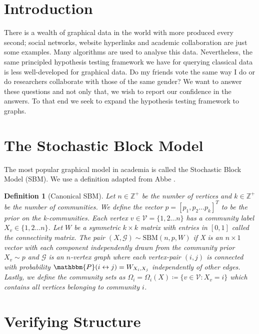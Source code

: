 \documentclass[]{article}
\newcommand{\Gcal}{\mathcal{G}}
\newcommand{\Vcal}{\mathcal{V}}
\newcommand{\Integers}{\mathbb{Z}}
\newcommand{\prob}{\mathbbm{P}}
\newtheorem{definition}{Definition}[section]
\begin{document}
\begin{multicols*}{2}

\section{Introduction}

There is a wealth of graphical data in the world with more produced every second; social networks, website hyperlinks and academic collaboration are just some examples. Many algorithms are used to analyse this data. Nevertheless, the same principled hypothesis testing framework we have for querying classical data is less well-developed for graphical data. Do my friends vote the same way I do or do researchers collaborate with those of the same gender? We want to answer these questions and not only that, we wish to report our confidence in the answers. To that end we seek to expand the hypothesis testing framework to graphs.

\section{The Stochastic Block Model}

The most popular graphical model in academia is called the Stochastic Block Model (SBM). We use a definition adapted from Abbe \cite{Abbe}.

\begin{definition}[Canonical SBM]
	\label{defn:sbm}
	Let $n \in \Integers^+$ be the number of vertices and $k \in \Integers^+$ be the number of communities. We define the vector $p = [p_1, p_2 \dots p_k]^T$ to be the prior on the k-communities. Each vertex $v \in \Vcal = \{1, 2 \dots n\}$ has a community label $X_v \in \{1, 2 \dots n\}$. Let $W$ be a symmetric $k \times k$ matrix with entries in $[0,1]$ called the connectivity matrix. The pair $(X, \Gcal) \sim \textrm{SBM}(n, p, W)$ if X is an $n \times 1$ vector with each component independently drawn from the community prior $X_v \sim p$ and $\Gcal$ is an $n$-vertex graph where each vertex-pair $(i, j)$ is connected with probability $\prob(i \leftrightarrow j) = W_{X_i, X_j}$ independently of other edges. Lastly, we define the community sets as $\Omega_i = \Omega_i(X) \coloneqq \{v \in \Vcal : X_v = i\}$ which contains all vertices belonging to community $i$.
\end{definition}

\section{Verifying Structure}

\end{multicols*}
\end{document}
